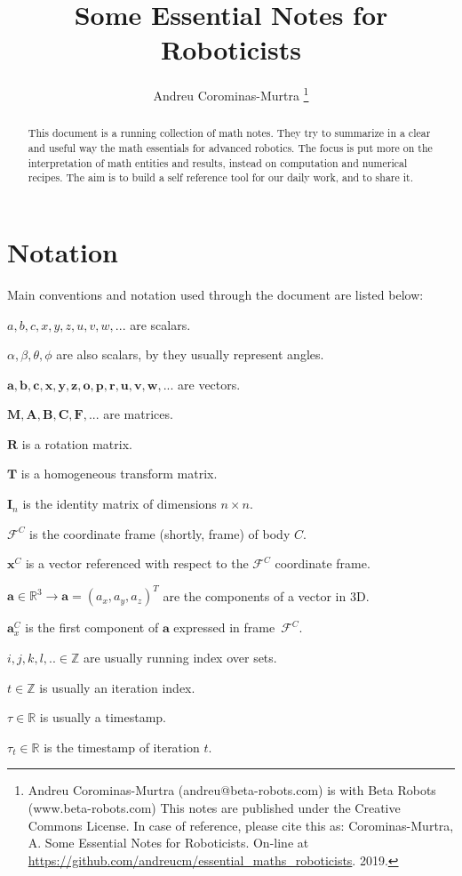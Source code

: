 \documentclass[a4paper,11pt]{article}
\title{Some Essential Notes for Roboticists}
\author{
  Andreu Corominas-Murtra
  \thanks{
    Andreu Corominas-Murtra (andreu@beta-robots.com) is with Beta Robots (www.beta-robots.com)
    This notes are published under the Creative Commons License. In case of reference, please cite this as: Corominas-Murtra, A. Some Essential Notes for Roboticists. On-line at \url{https://github.com/andreucm/essential_maths_roboticists}. 2019. }
}
\begin{document}
\maketitle

\begin{abstract}
This document is a running collection of math notes. They try to summarize in a clear and useful way the math essentials for advanced robotics. The focus is put more on the interpretation of math entities and results, instead on computation and numerical recipes. The aim is to build a self reference tool for our daily work, and to share it. 
\end{abstract}

\newpage

\tableofcontents

\newpage
\section{Notation}
Main conventions and notation used through the document are listed below:

$a,b,c,x,y,z,u,v,w,...$ are scalars.

$\alpha,\beta,\theta,\phi$ are also scalars, by they usually represent angles. 

$\mathbf{a,b,c,x,y,z,o,p,r,u,v,w,...}$ are vectors.

$\mathbf{M,A,B,C,F,...}$ are matrices.

$\mathbf{R}$ is a rotation matrix.

$\mathbf{T}$ is a homogeneous transform matrix.

$\mathbf{I}_n$ is the identity matrix of dimensions $n \times n$.

$\mathcal{F}^C$ is the coordinate frame (shortly, frame) of body $C$.

$\mathbf{x}^C$ is a vector referenced with respect to the $\mathcal{F}^C$ coordinate frame.

$\mathbf{a}\in \mathbb{R}^3 \rightarrow \mathbf{a} = (a_x,a_y,a_z)^T$ are the components of a vector in 3D.

$\mathbf{a}^C_x$ is the first component of $\mathbf{a}$ expressed in frame~$\mathcal{F}^C$.

$i,j,k,l,.. \in \mathbb{Z}$ are usually running index over sets. 

$t \in \mathbb{Z}$ is usually an iteration index.

$\tau \in \mathbb{R}$ is usually a timestamp.

$\tau_t \in \mathbb{R}$ is the timestamp of iteration $t$.
\end{document}

